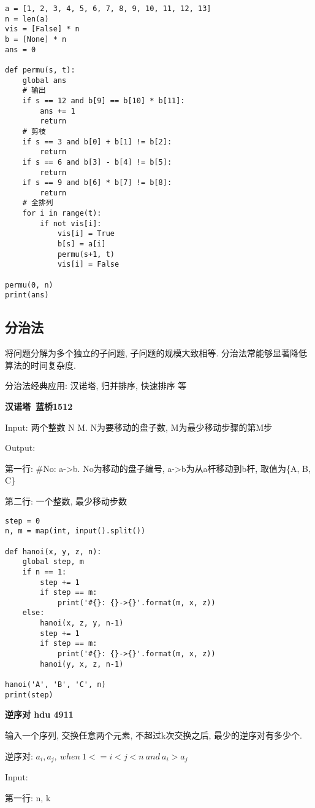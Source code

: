 \documentclass[../main]{subfiles}
\begin{document}
\begin{sloppy}
\begin{lstlisting}[style = Python]
a = [1, 2, 3, 4, 5, 6, 7, 8, 9, 10, 11, 12, 13]
n = len(a)
vis = [False] * n
b = [None] * n
ans = 0

def permu(s, t):
    global ans
    # 输出
    if s == 12 and b[9] == b[10] * b[11]:
        ans += 1
        return
    # 剪枝
    if s == 3 and b[0] + b[1] != b[2]:
        return
    if s == 6 and b[3] - b[4] != b[5]:
        return
    if s == 9 and b[6] * b[7] != b[8]:
        return
    # 全排列
    for i in range(t):
        if not vis[i]:
            vis[i] = True
            b[s] = a[i]
            permu(s+1, t)
            vis[i] = False

permu(0, n)
print(ans)
\end{lstlisting}

\newpage
\subsection{分治法}

将问题分解为多个独立的子问题, 子问题的规模大致相等. 分治法常能够显著降低算法的时间复杂度.

分治法经典应用: 汉诺塔, 归并排序, 快速排序 等

\textbf{汉诺塔\ 蓝桥1512}

Input: 两个整数 N M. N为要移动的盘子数, M为最少移动步骤的第M步

Output: 

第一行: \#No: a->b. No为移动的盘子编号, a->b为从a杆移动到b杆, 取值为\{A, B, C\}

第二行: 一个整数, 最少移动步数

\begin{lstlisting}[style = Python]
step = 0
n, m = map(int, input().split())

def hanoi(x, y, z, n):
    global step, m
    if n == 1:
        step += 1
        if step == m:
            print('#{}: {}->{}'.format(m, x, z))
    else:
        hanoi(x, z, y, n-1)
        step += 1
        if step == m:
            print('#{}: {}->{}'.format(m, x, z))
        hanoi(y, x, z, n-1)

hanoi('A', 'B', 'C', n)
print(step)
\end{lstlisting}

\newpage
\textbf{逆序对 hdu 4911}

输入一个序列, 交换任意两个元素, 不超过k次交换之后, 最少的逆序对有多少个.

逆序对: $a_i, a_j,\ when\ 1 <= i < j < n\ and\ a_i > a_j$ 

Input: 

第一行: n, k


\end{sloppy}
\end{document}
